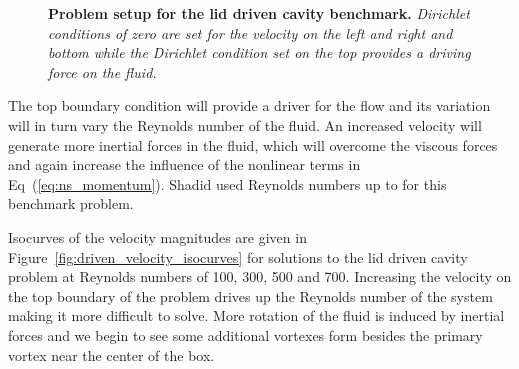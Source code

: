 \begin{figure}[t!]
  \begin{center}
    \scalebox{1.5}{
       }
  \end{center}
  \caption{\textbf{Problem setup for the lid driven cavity benchmark.}
    \textit{Dirichlet conditions of zero are set for the velocity on
      the left and right and bottom while the Dirichlet condition set
      on the top provides a driving force on the fluid.}}
  \label{fig:lid_driven_cavity}
\end{figure}

The top boundary condition will provide a driver for the flow and its
variation will in turn vary the Reynolds number of the fluid. An
increased velocity will generate more inertial forces in the fluid,
which will overcome the viscous forces and again increase the
influence of the nonlinear terms in Eq~(\ref{eq:ns_momentum}). Shadid
used Reynolds numbers up to  for this benchmark problem.

Isocurves of the velocity magnitudes are given in
Figure~\ref{fig:driven_velocity_isocurves} for solutions to the lid
driven cavity problem at Reynolds numbers of 100, 300, 500 and
700. Increasing the velocity on the top boundary of the problem drives
up the Reynolds number of the system making it more difficult to
solve. More rotation of the fluid is induced by inertial forces and we
begin to see some additional vortexes form besides the primary vortex
near the center of the box.

